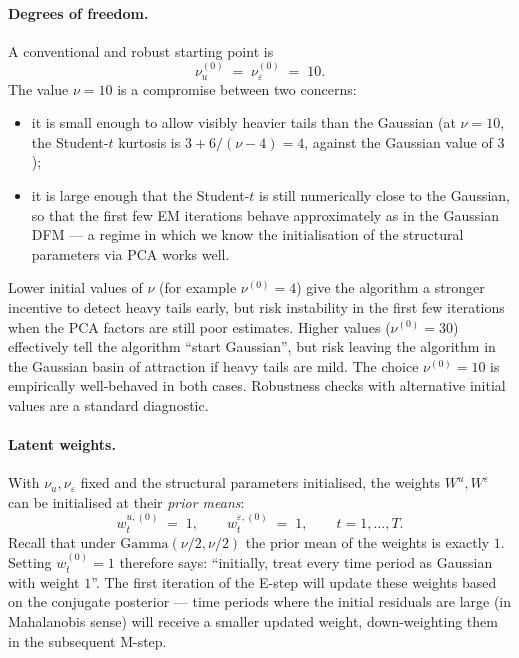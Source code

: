 \documentclass[11pt, a4paper, oneside]{article}
\begin{document}
\paragraph{Degrees of freedom.}
A conventional and robust starting point is
\begin{equation}
\nu_u^{(0)} \;=\; \nu_\varepsilon^{(0)} \;=\; 10.
\label{eq:init-nu}
\end{equation}
The value $\nu = 10$ is a compromise between two concerns:
\begin{itemize}[leftmargin=1.5em, itemsep=3pt]
    \item it is small enough to allow visibly heavier tails than the
          Gaussian (at $\nu = 10$, the Student-$t$ kurtosis is
          $3 + 6/(\nu - 4) = 4$, against the Gaussian value of $3$);
    \item it is large enough that the Student-$t$ is still numerically
          close to the Gaussian, so that the first few EM iterations
          behave approximately as in the Gaussian DFM — a regime in
          which we know the initialisation of the structural parameters
          via PCA works well.
\end{itemize}
Lower initial values of $\nu$ (for example $\nu^{(0)} = 4$) give the
algorithm a stronger incentive to detect heavy tails early, but risk
instability in the first few iterations when the PCA factors are still
poor estimates. Higher values ($\nu^{(0)} = 30$) effectively tell the
algorithm ``start Gaussian'', but risk leaving the algorithm in the
Gaussian basin of attraction if heavy tails are mild. The choice
$\nu^{(0)} = 10$ is empirically well-behaved in both cases. Robustness
checks with alternative initial values are a standard diagnostic.

\paragraph{Latent weights.}
With $\nu_u, \nu_\varepsilon$ fixed and the structural parameters
initialised, the weights $W^u, W^\varepsilon$ can be initialised at
their \emph{prior means}:
\begin{equation}
w^{u,(0)}_t \;=\; 1, \qquad w^{\varepsilon,(0)}_t \;=\; 1, \qquad t = 1, \ldots, T.
\label{eq:init-W}
\end{equation}
Recall that under $\mathrm{Gamma}(\nu/2, \nu/2)$ the prior mean of the
weights is exactly $1$. Setting
$w_t^{(0)} = 1$ therefore says: ``initially, treat every time period as
Gaussian with weight $1$''. The first iteration of the E-step will
update these weights based on the conjugate posterior — time periods
where the initial residuals are large (in Mahalanobis sense) will
receive a smaller updated weight, down-weighting them in the subsequent
M-step.
\end{document}
